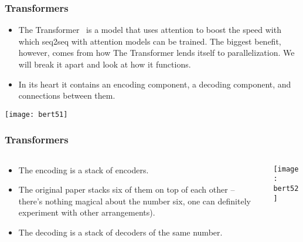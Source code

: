 \begin{frame}[fragile]\frametitle{Transformers}


\begin{itemize}
\item The Transformer  is a model that uses attention to boost the speed with which seq2seq with attention models can be trained. The biggest benefit, however, comes from how The Transformer lends itself to parallelization. We will break it apart and look at how it functions.
\item In its heart it contains an encoding component, a decoding component, and connections between them.
\end{itemize}	 

\begin{center}
\texttt{[image: bert51]}
\end{center}	

\end{frame}


\begin{frame}[fragile]\frametitle{Transformers}
\begin{columns}
    \begin{column}[T]{0.5\linewidth}
      \begin{itemize}
			\item The encoding is a stack of encoders.
			\item The original paper stacks six of them on top of each other – there’s nothing magical about the number six, one can definitely experiment with other arrangements). 
			\item The decoding is a stack of decoders of the same number.
			\end{itemize}
		\end{column}
    \begin{column}[T]{0.5\linewidth}
		
			\begin{center}
			\texttt{[image: bert52]}
			\end{center}

    \end{column}
  \end{columns}
\end{frame}



